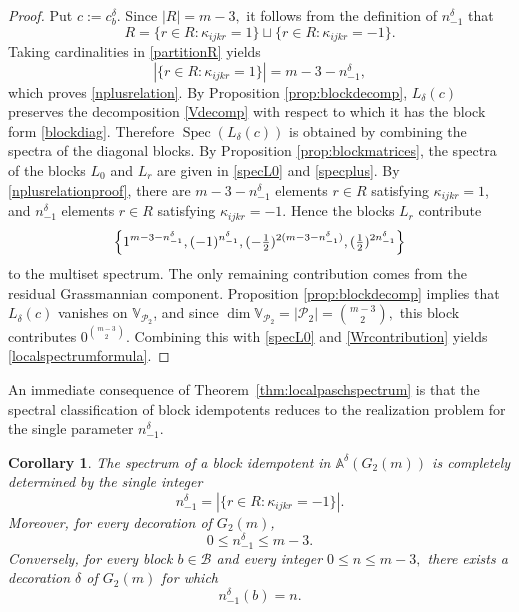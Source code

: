 \documentclass[times,11pt,reqno]{amsproc}
\newtheorem{corollary}[theorem]{Corollary}
\theoremstyle{definition}
\numberwithin{equation}{section}
\def\alg{\mathbb{A}}
\def\valg{\mathbb{V}}
\DeclareMathOperator{\Spec}{Spec}
\begin{document}
\begin{proof}
Put $c:=c_b^\delta.$
Since $|R|=m-3,$
it follows from the definition of $n^{\delta}_{-1}$ that
\begin{equation}\label{partitionR}
R=
\{r\in R:\kappa_{ijkr}=1\}
\sqcup
\{r\in R:\kappa_{ijkr}=-1\}.
\end{equation}
Taking cardinalities in \eqref{partitionR} yields
\begin{equation}\label{nplusrelationproof}
|\{r\in R:\kappa_{ijkr}=1\}|
=
m-3-n^{\delta}_{-1},
\end{equation}
which proves \eqref{nplusrelation}.
By Proposition \ref{prop:blockdecomp}, $L_\delta(c)$ preserves the decomposition \eqref{Vdecomp} with respect to which it has the block form \eqref{blockdiag}.
Therefore
$\Spec(L_\delta(c))$
is obtained by combining the spectra of the diagonal blocks. By Proposition \ref{prop:blockmatrices}, the spectra of the blocks $L_0$ and $L_r$ are given in \eqref{specL0} and \eqref{specplus}.
By \eqref{nplusrelationproof}, there are $m-3-n^{\delta}_{-1}$ elements $r\in R$ satisfying $\kappa_{ijkr}=1$, and $n^{\delta}_{-1}$ elements $r\in R$ satisfying $\kappa_{ijkr}=-1$.
Hence the blocks $L_r$ contribute
\begin{equation}\label{Wrcontribution}
\Bigl\{
1^{m-3-n^{\delta}_{-1}},
(-1)^{n^{\delta}_{-1}},
(-\tfrac12)^{2(m-3-n^{\delta}_{-1})},
(\tfrac12)^{2n^{\delta}_{-1}}
\Bigr\}
\end{equation}
to the multiset spectrum.
The only remaining contribution comes from the residual Grassmannian component. Proposition \ref{prop:blockdecomp} implies that $L_\delta(c)$ vanishes on $\valg_{\mathcal{P}_2}$,
and since
$
\dim\valg_{\mathcal{P}_2}
=
|\mathcal{P}_2|
=
\binom{m-3}{2},
$
this block contributes $0^{\binom{m-3}{2}}.$ Combining this with \eqref{specL0} and \eqref{Wrcontribution} yields \eqref{localspectrumformula}.
\end{proof}

An immediate consequence of Theorem~\ref{thm:localpaschspectrum} is that the spectral classification of block idempotents reduces to the realization problem for the single parameter $n_{-1}^\delta$.

\begin{corollary}\label{cor:realizable}
The spectrum of a block idempotent in
$\alg^\delta(G_2(m))$
is completely determined by the single integer
$$
n^{\delta}_{-1}
=
|\{r\in R:\kappa_{ijkr}=-1\}|.
$$
Moreover, for every decoration of $G_2(m)$,
$$
0\le n^{\delta}_{-1}\le m-3.
$$
Conversely, for every block $b\in\mathcal B$ and every integer
$
0\le n\le m-3,
$
there exists a decoration $\delta$ of $G_2(m)$ for which
\begin{equation}\label{realizablevalue}
n^{\delta}_{-1}(b)=n.
\end{equation}
\end{corollary}
\end{document}
